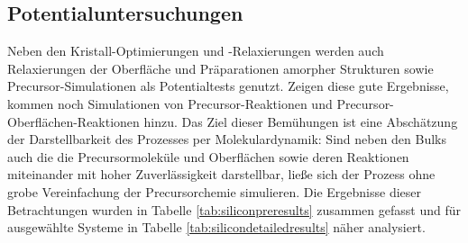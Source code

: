 \subsection{Potentialuntersuchungen}

Neben den Kristall-Optimierungen und -Relaxierungen werden auch Relaxierungen der Oberfläche und Präparationen amorpher Strukturen sowie Precursor-Simulationen als Potentialtests genutzt.
Zeigen diese gute Ergebnisse, kommen noch Simulationen von Precursor-Reaktionen und Precursor-Oberflächen-Reaktionen hinzu.
Das Ziel dieser Bemühungen ist eine Abschätzung der Darstellbarkeit des Prozesses per Molekulardynamik:
Sind neben den Bulks auch die die Precursormoleküle und Oberflächen sowie deren Reaktionen miteinander mit hoher Zuverlässigkeit darstellbar, ließe sich der Prozess ohne grobe Vereinfachung der Precursorchemie simulieren.
Die Ergebnisse dieser Betrachtungen wurden in Tabelle \ref{tab:siliconpreresults} zusammen gefasst und für ausgewählte Systeme in Tabelle \ref{tab:silicondetailedresults} näher analysiert.

